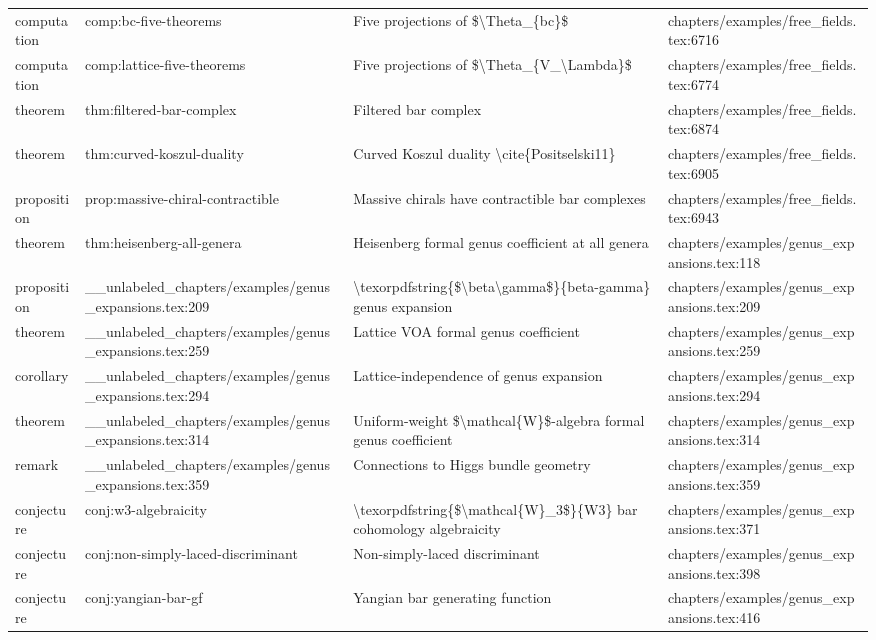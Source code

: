 \documentclass[11pt]{article}
\begin{document}
\begin{longtable}{L{0.10\textwidth}L{0.26\textwidth}L{0.42\textwidth}L{0.22\textwidth}}
computation & comp:bc-five-theorems & Five projections of \$\textbackslash{}Theta\_\{bc\}\$ & chapters/examples/free\_fields.tex:6716\\
computation & comp:lattice-five-theorems & Five projections of \$\textbackslash{}Theta\_\{V\_\textbackslash{}Lambda\}\$ & chapters/examples/free\_fields.tex:6774\\
theorem & thm:filtered-bar-complex & Filtered bar complex & chapters/examples/free\_fields.tex:6874\\
theorem & thm:curved-koszul-duality & Curved Koszul duality \textbackslash{}cite\{Positselski11\} & chapters/examples/free\_fields.tex:6905\\
proposition & prop:massive-chiral-contractible & Massive chirals have contractible bar complexes & chapters/examples/free\_fields.tex:6943\\
theorem & thm:heisenberg-all-genera & Heisenberg formal genus coefficient at all genera & chapters/examples/genus\_expansions.tex:118\\
proposition & \_\_unlabeled\_chapters/examples/genus\_expansions.tex:209 & \textbackslash{}texorpdfstring\{\$\textbackslash{}beta\textbackslash{}gamma\$\}\{beta-gamma\} genus expansion & chapters/examples/genus\_expansions.tex:209\\
theorem & \_\_unlabeled\_chapters/examples/genus\_expansions.tex:259 & Lattice VOA formal genus coefficient & chapters/examples/genus\_expansions.tex:259\\
corollary & \_\_unlabeled\_chapters/examples/genus\_expansions.tex:294 & Lattice-independence of genus expansion & chapters/examples/genus\_expansions.tex:294\\
theorem & \_\_unlabeled\_chapters/examples/genus\_expansions.tex:314 & Uniform-weight \$\textbackslash{}mathcal\{W\}\$-algebra formal genus coefficient & chapters/examples/genus\_expansions.tex:314\\
remark & \_\_unlabeled\_chapters/examples/genus\_expansions.tex:359 & Connections to Higgs bundle geometry & chapters/examples/genus\_expansions.tex:359\\
conjecture & conj:w3-algebraicity & \textbackslash{}texorpdfstring\{\$\textbackslash{}mathcal\{W\}\_3\$\}\{W3\} bar cohomology algebraicity & chapters/examples/genus\_expansions.tex:371\\
conjecture & conj:non-simply-laced-discriminant & Non-simply-laced discriminant & chapters/examples/genus\_expansions.tex:398\\
conjecture & conj:yangian-bar-gf & Yangian bar generating function & chapters/examples/genus\_expansions.tex:416\\

\end{longtable}
\end{document}

